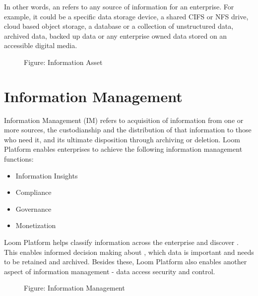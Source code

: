 \documentclass[letterpaper,10pt,english]{sphinxmanual}
\begin{document}
In other words, an  refers to any source of information for an enterprise.  For example, it could be a specific data storage device, a shared CIFS or NFS drive, cloud based object storage, a database or a collection of unstructured data, archived data, backed up data or any enterprise owned data stored on an accessible digital media.

\begin{figure}[htbp]
\centering
\capstart

\noindent{}
\caption{Figure: Information Asset}\label{\detokenize{mcdmp_concepts:id8}}\end{figure}


\section{Information Management}
\label{\detokenize{mcdmp_concepts:information-management}}
Information Management (IM) refers to acquisition of information from one or more sources, the custodianship and the distribution of that information to those who need it, and its ultimate disposition through archiving or deletion. Loom Platform enables enterprises to achieve the following information management functions:
\begin{itemize}
\item {} 
Information Insights

\item {} 
Compliance

\item {} 
Governance

\item {} 
Monetization

\end{itemize}

Loom Platform helps classify information across the enterprise and discover . This enables informed decision making about , which data is important and needs to be retained and archived.  Besides these, Loom Platform also enables another aspect of information management - data access security and control.

\begin{figure}[htbp]
\centering
\capstart

\noindent{}
\caption{Figure: Information Management}\label{\detokenize{mcdmp_concepts:id9}}\end{figure}
\end{document}
